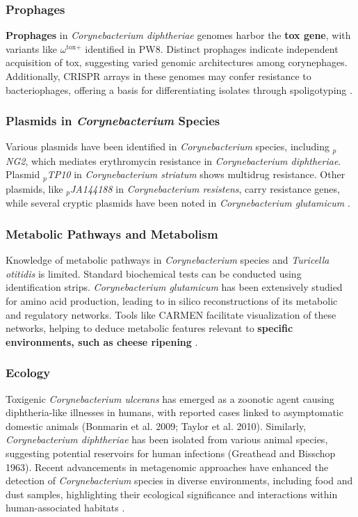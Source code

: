 \subsubsection*{Prophages}
\textbf{Prophages} in \textit{Corynebacterium diphtheriae} genomes harbor the \textbf{tox gene}, with variants like $\omega^{\text{tox+}}$ identified in PW8. Distinct prophages indicate independent acquisition of tox, suggesting varied genomic architectures among corynephages. Additionally, CRISPR arrays in these genomes may confer resistance to bacteriophages, offering a basis for differentiating isolates through spoligotyping \cite*{L8-MicroInFood}.

\subsubsection*{Plasmids in \textit{Corynebacterium} Species}
Various plasmids have been identified in \textit{Corynebacterium} species, including \textit{$_p$NG2}, which mediates erythromycin resistance in \textit{Corynebacterium diphtheriae}. Plasmid \textit{$_p$TP10} in \textit{Corynebacterium striatum} shows multidrug resistance. Other plasmids, like \textit{$_p$JA144188} in \textit{Corynebacterium resistens}, carry resistance genes, while several cryptic plasmids have been noted in \textit{Corynebacterium glutamicum} \cite*{L9-Coryn}.

\subsubsection*{Metabolic Pathways and Metabolism}
Knowledge of metabolic pathways in \textit{Corynebacterium} species and \textit{Turicella otitidis} is limited. Standard biochemical tests can be conducted using identification strips. \textit{Corynebacterium glutamicum} has been extensively studied for amino acid production, leading to in silico reconstructions of its metabolic and regulatory networks. Tools like CARMEN facilitate visualization of these networks, helping to deduce metabolic features relevant to \textbf{specific environments, such as cheese ripening} \cite*{L9-Coryn}.

\subsubsection*{Ecology}
Toxigenic \textit{Corynebacterium ulcerans} has emerged as a zoonotic agent causing diphtheria-like illnesses in humans, with reported cases linked to asymptomatic domestic animals (Bonmarin et al. 2009; Taylor et al. 2010). Similarly, \textit{Corynebacterium diphtheriae} has been isolated from various animal species, suggesting potential reservoirs for human infections (Greathead and Bisschop 1963). Recent advancements in metagenomic approaches have enhanced the detection of \textit{Corynebacterium} species in diverse environments, including food and dust samples, highlighting their ecological significance and interactions within human-associated habitats \cite*{L9-Coryn}.


